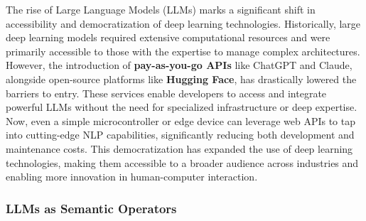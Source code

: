 The rise of Large Language Models (LLMs) marks a significant shift in accessibility and democratization of deep learning technologies.
Historically, large deep learning models required extensive computational resources and were primarily accessible to those with the expertise to manage complex architectures.
However, the introduction of \textbf{pay-as-you-go APIs} like ChatGPT and Claude, alongside open-source platforms like \textbf{Hugging Face}, has drastically lowered the barriers to entry.
These services enable developers to access and integrate powerful LLMs without the need for specialized infrastructure or deep expertise.
Now, even a simple microcontroller or edge device can leverage web APIs to tap into cutting-edge NLP capabilities, significantly reducing both development and maintenance costs.
This democratization has expanded the use of deep learning technologies, making them accessible to a broader audience across industries and enabling more innovation in human-computer interaction.

\subsubsection{ LLMs as Semantic Operators}




